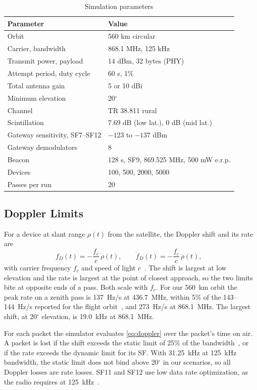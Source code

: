 \documentclass[journal]{IEEEtran}
\begin{document}
\begin{table}[t]
\centering
\caption{Simulation parameters}\label{tab:params}
\begin{tabular}{@{}ll@{}}
\toprule
Parameter & Value \\
\midrule
Orbit & 560 km circular \\
Carrier, bandwidth & 868.1 MHz, 125 kHz \\
Transmit power, payload & 14 dBm, 32 bytes (PHY) \\
Attempt period, duty cycle & 60 s, 1\% \\
Total antenna gain & 5 or 10 dBi \\
Minimum elevation & 20$^\circ$ \\
Channel & TR 38.811 rural \\
Scintillation & 7.69 dB (low lat.), 0 dB (mid lat.) \\
Gateway sensitivity, SF7--SF12 & $-123$ to $-137$ dBm \\
Gateway demodulators & 8 \\
Beacon & 128 s, SF9, 869.525 MHz, 500 mW e.r.p. \\
Devices & 100, 500, 2000, 5000 \\
Passes per run & 20 \\
\bottomrule
\end{tabular}
\end{table}

\subsection{Doppler Limits}
For a device at slant range $\rho(t)$ from the satellite, the Doppler shift and its rate are
\begin{equation}\label{eq:doppler}
f_D(t)=-\frac{f_c}{c}\,\dot\rho(t),\qquad \dot f_D(t)=-\frac{f_c}{c}\,\ddot\rho(t),
\end{equation}
with carrier frequency $f_c$ and speed of light $c$~\cite{asadullah2024}. The shift is largest at low elevation and the rate is largest at the point of closest approach, so the two limits bite at opposite ends of a pass. Both scale with $f_c$. For our 560~km orbit the peak rate on a zenith pass is 137~Hz/s at 436.7~MHz, within 5\% of the 143--144~Hz/s reported for the flight orbit~\cite{zadorozhny2022,asadullah2024}, and 273~Hz/s at 868.1~MHz. The largest shift, at 20$^\circ$ elevation, is 19.0~kHz at 868.1~MHz.

For each packet the simulator evaluates \eqref{eq:doppler} over the packet's time on air. A packet is lost if the shift exceeds the static limit of 25\% of the bandwidth~\cite{asadullah2024,zadorozhny2022}, or if the rate exceeds the dynamic limit for its SF. With 31.25~kHz at 125~kHz bandwidth, the static limit does not bind above 20$^\circ$ in our scenarios, so all Doppler losses are rate losses. SF11 and SF12 use low data rate optimization, as the radio requires at 125~kHz~\cite{sx1276}.
\end{document}
